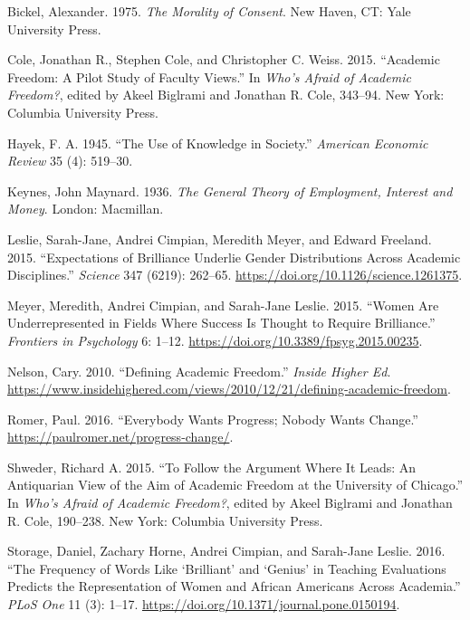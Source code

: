 \documentclass[
  11pt,
  letterpaper,
  DIV=11,
  numbers=noendperiod]{scrartcl}
\newlength{\cslhangindent}
\newenvironment{CSLReferences}[2] %
 {\begin{list}{}{%
  \setlength{\itemindent}{0pt}
  \setlength{\leftmargin}{0pt}
  \setlength{\parsep}{0pt}
  \ifodd #1
   \setlength{\leftmargin}{\cslhangindent}
   \setlength{\itemindent}{-1\cslhangindent}
  \fi
  \setlength{\itemsep}{#2\baselineskip}}}
 {\end{list}}
\begin{document}
\label{refs}
\begin{CSLReferences}{1}{0}
Bickel, Alexander. 1975. \emph{The Morality of Consent}. New Haven, CT:
Yale University Press.

Cole, Jonathan R., Stephen Cole, and Christopher C. Weiss. 2015.
{``Academic Freedom: A Pilot Study of Faculty Views.''} In \emph{Who's
Afraid of Academic Freedom?}, edited by Akeel Biglrami and Jonathan R.
Cole, 343--94. New York: Columbia University Press.

Hayek, F. A. 1945. {``The Use of Knowledge in Society.''} \emph{American
Economic Review} 35 (4): 519--30.

Keynes, John Maynard. 1936. \emph{The General Theory of Employment,
Interest and Money}. London: Macmillan.

Leslie, Sarah-Jane, Andrei Cimpian, Meredith Meyer, and Edward Freeland.
2015. {``Expectations of Brilliance Underlie Gender Distributions Across
Academic Disciplines.''} \emph{Science} 347 (6219): 262--65.
\url{https://doi.org/10.1126/science.1261375}.

Meyer, Meredith, Andrei Cimpian, and Sarah-Jane Leslie. 2015. {``Women
Are Underrepresented in Fields Where Success Is Thought to Require
Brilliance.''} \emph{Frontiers in Psychology} 6: 1--12.
\url{https://doi.org/10.3389/fpsyg.2015.00235}.

Nelson, Cary. 2010. {``Defining Academic Freedom.''} \emph{Inside Higher
Ed}.
\url{https://www.insidehighered.com/views/2010/12/21/defining-academic-freedom}.

Romer, Paul. 2016. {``Everybody Wants Progress; Nobody Wants Change.''}
\url{https://paulromer.net/progress-change/}.

Shweder, Richard A. 2015. {``To Follow the Argument Where It Leads: An
Antiquarian View of the Aim of Academic Freedom at the University of
Chicago.''} In \emph{Who's Afraid of Academic Freedom?}, edited by Akeel
Biglrami and Jonathan R. Cole, 190--238. New York: Columbia University
Press.

Storage, Daniel, Zachary Horne, Andrei Cimpian, and Sarah-Jane Leslie.
2016. {``The Frequency of Words Like {`Brilliant'} and {`Genius'} in
Teaching Evaluations Predicts the Representation of Women and African
Americans Across Academia.''} \emph{PLoS One} 11 (3): 1--17.
\url{https://doi.org/10.1371/journal.pone.0150194}.


\end{CSLReferences}
\end{document}
